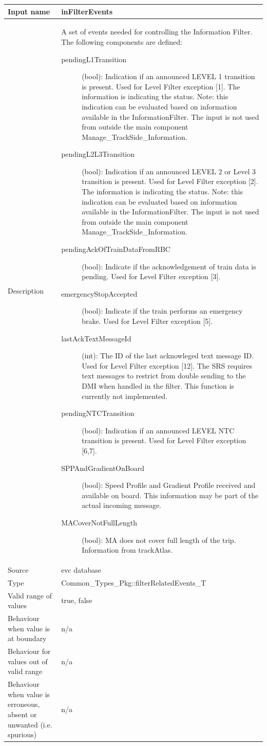 \begin{longtable}{p{}p{}}
\toprule
Input name				& inFilterEvents \\
\midrule
Description				& A set of events needed for controlling the Information Filter. The following components are defined:
\begin{description}
\item[pendingL1Transition](bool): Indication if an announced LEVEL 1 transition is present. Used for Level Filter exception [1]. The information is indicating the status.
Note: this indication can be evaluated based on information available in the InformationFilter. The input is not used from outside the main component Manage\_TrackSide\_Information.
\item[pendingL2L3Transition](bool): Indication if an announced LEVEL 2 or Level 3 transition is present. Used for Level Filter exception [2]. The information is indicating the status.
Note: this indication can be evaluated based on information available in the InformationFilter. The input is not used from outside the main component Manage\_TrackSide\_Information.
\item[pendingAckOfTrainDataFromRBC](bool): Indicate if the acknowledgement of train data is pending. Used for Level Filter exception [3].
\item[emergencyStopAccepted](bool): Indicate if the train performs an emergency brake. Used for Level Filter exception [5].
\item[lastAckTextMessageId](int): The ID of the last acknowleged text message ID. Used for Level Filter exception [12]. The SRS requires text messages to restrict from double sending to the DMI when handled in the filter. This function is currently not implemented. 
\item[pendingNTCTransition](bool): Indication if an announced LEVEL NTC transition is present. Used for Level Filter exception [6,7].
\item[SPPAndGradientOnBoard](bool): Speed Profile and Gradient Profile received and available on board. This information may be part of the actual incoming message.
\item[MACoverNotFullLength](bool): MA does not cover full length of the trip. Information from trackAtlas.
\end{description}

\\
\midrule
Source					& evc database\\ 
\midrule
Type					& Common\_Types\_Pkg::filterRelatedEvents\_T\\
\midrule
Valid range of values	& true, false\\
\midrule
Behaviour when value is at boundary	& n/a\\
\midrule
Behaviour for values out of valid range	& n/a\\
\midrule
Behaviour when value is erroneous, absent or unwanted (i.e. spurious) & n/a\\
\bottomrule
\end{longtable}

